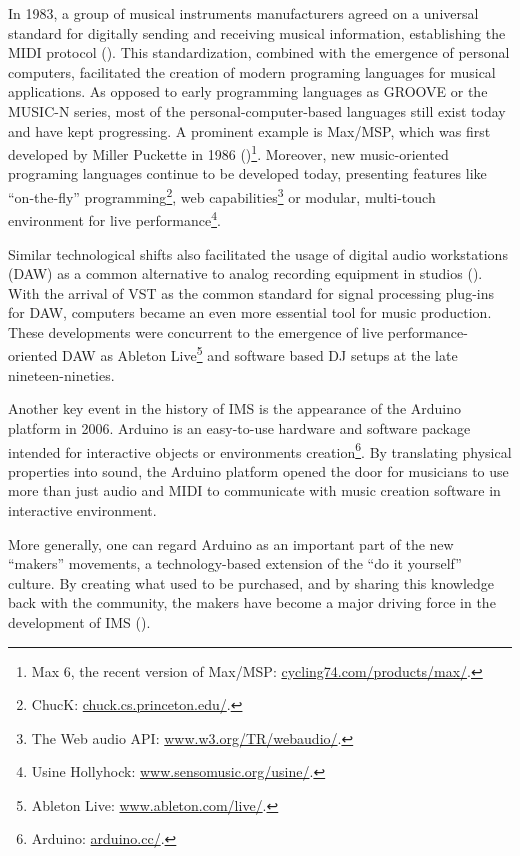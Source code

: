 \documentclass[a4paper,11pt]{article}
\begin{document}
In 1983, a group of musical instruments manufacturers agreed on a universal standard for digitally sending and receiving musical information, establishing the MIDI protocol (\cite{web:quinn}).
This standardization, combined with the emergence of personal computers, facilitated the creation of modern programing languages for musical applications.
As opposed to early programming languages as GROOVE or the MUSIC-N series, most of the personal-computer-based languages still exist today and have kept progressing.
A prominent example is Max/MSP, which was first developed by Miller Puckette in 1986 (\cite[p. 16]{winkler01})\footnote{Max 6, the recent version of Max/MSP: \href{http://cycling74.com/products/max/}{cycling74.com/products/max/}.}.
Moreover, new music-oriented programing languages continue to be developed today, presenting features like ``on-the-fly'' programming\footnote{ChucK: \href{http://chuck.cs.princeton.edu/}{chuck.cs.princeton.edu/}.}, web capabilities\footnote{The Web audio API: \href{http://www.w3.org/TR/webaudio/}{www.w3.org/TR/webaudio/}.} or modular, multi-touch environment for live performance\footnote{Usine Hollyhock: \href{http://www.sensomusic.org/usine/}{www.sensomusic.org/usine/}.}.

Similar technological shifts also facilitated the usage of digital audio workstations (DAW) as a common alternative to analog recording equipment in studios (\cite{leider:04}).
With the arrival of VST as the common standard for signal processing plug-ins for DAW, computers became an even more essential tool for music production.
These developments were concurrent to the emergence of live performance-oriented DAW as Ableton Live\footnote{Ableton Live: \href{http://www.ableton.com/en/live/}{www.ableton.com/live/}.} and software based DJ setups at the late nineteen-nineties.

Another key event in the history of IMS is the appearance of the Arduino platform in 2006.
Arduino is an easy-to-use hardware and software package intended for interactive objects or environments creation\footnote{Arduino: \href{http://arduino.cc/}{arduino.cc/}.}.
By translating physical properties into sound, the Arduino platform opened the door for musicians to use more than just audio and MIDI to communicate with music creation software in interactive environment.

More generally, one can regard Arduino as an important part of the new ``makers'' movements, a technology-based extension of the ``do it yourself'' culture.
By creating what used to be purchased, and by sharing this knowledge back with the community, the makers have become a major driving force in the development of IMS (\cite{web:kirn12}).
\end{document}
